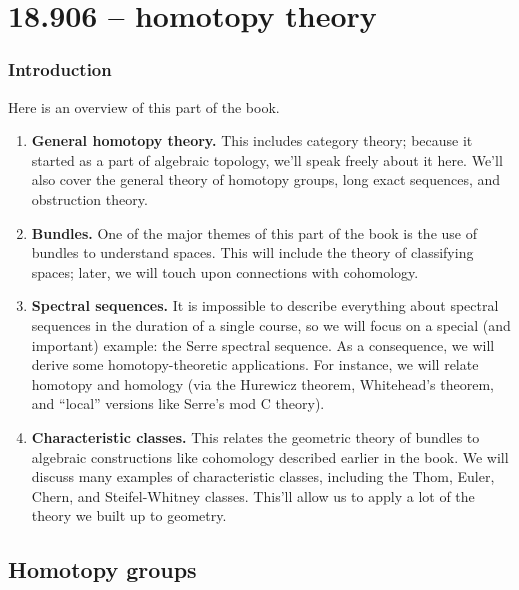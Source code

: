 \documentclass[a4paper]{extbook}
\begin{document}
\part{18.906 -- homotopy theory}\label{906}

\section*{Introduction}
Here is an overview of this part of the book.
\begin{enumerate}
    \item \textbf{General homotopy theory.}
	This includes category theory; because it started as a part of algebraic topology,
	we'll speak freely about it here.
	We'll also cover the general theory of homotopy groups,
	long exact sequences, and obstruction theory.
    \item \textbf{Bundles.}
	One of the major themes of this part of the book is
	the use of bundles to understand spaces.
	This will include the theory of classifying spaces; later, 
	we will touch upon connections with cohomology.
    \item \textbf{Spectral sequences.}
	It is impossible to describe everything about spectral sequences in the duration
	of a single course, so we will focus on a special (and important) example:
	the Serre spectral sequence.
	As a consequence, we will derive some homotopy-theoretic applications.
	For instance, we will relate homotopy and homology
	(via the Hurewicz theorem, Whitehead's theorem, and ``local'' versions like Serre's
	mod C theory).
    \item \textbf{Characteristic classes.}
	This relates the geometric theory of bundles to algebraic constructions like cohomology
	described earlier in the book.
	We will discuss many examples of characteristic classes, including the
	Thom, Euler, Chern, and Steifel-Whitney classes.
	This'll allow us to apply a lot of the theory we built up to geometry.
\end{enumerate}

\chapter{Homotopy groups}













\end{document}
